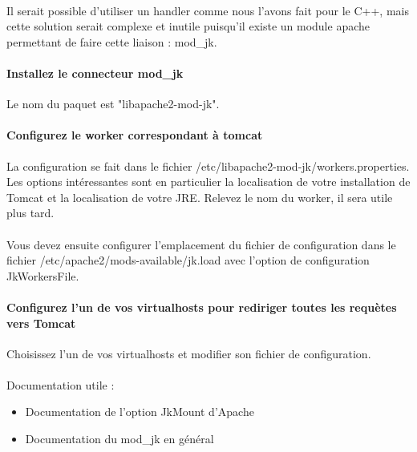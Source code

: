 \documentclass[12pt,a4paper]{article}
\begin{document}
\paragraph{}
Il serait possible d'utiliser un handler comme nous l'avons fait pour le C++, mais cette solution serait complexe et inutile puisqu'il existe un module apache permettant de faire cette liaison : mod\_jk.

\paragraph{Installez le connecteur mod\_jk\\}
Le nom du paquet est "libapache2-mod-jk". 

\paragraph{Configurez le worker correspondant à tomcat\\}
La configuration se fait dans le fichier /etc/libapache2-mod-jk/workers.properties. Les options intéressantes sont en particulier la localisation de votre installation de Tomcat et la localisation de votre JRE. Relevez le nom du worker, il sera utile plus tard.

\paragraph{}
Vous devez ensuite configurer l'emplacement du fichier de configuration dans le fichier /etc/apache2/mods-available/jk.load avec l'option de configuration JkWorkersFile.

\paragraph{Configurez l'un de vos virtualhosts pour rediriger toutes les requètes vers Tomcat\\}
Choisissez l'un de vos virtualhosts et modifier son fichier de configuration.

\paragraph{}
Documentation utile : 
\begin{itemize}
\item Documentation de l'option JkMount d'Apache
\item Documentation du mod\_jk en général
\end{itemize}
\end{document}
